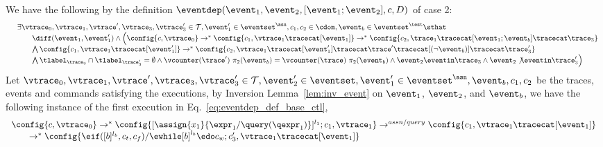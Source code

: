 \begin{subproof}
%
\label{pf:eventdep_base_ctl}
We have the following by the definition $\eventdep(\event_1, \event_2, [\event_1; \event_2], c, D)$ of case 2:
\begin{equation}
  \label{eq:eventdep_def_base_ctl}
  \begin{array}{ll}   
    & \exists \vtrace_0,
    \vtrace_1, \vtrace', \vtrace_3, \vtrace_3' \in \mathcal{T},\event_1' \in \eventset^{\asn}, {c}_1, {c}_2  \in \cdom, 
    \event_b \in \eventset^{\test}
    \sthat 
    \\ 
   &   \qquad    \diff(\event_1, \event_1') 
\land
   \Big(
  \config{{c}, \vtrace_0} \rightarrow^{*} 
      \config{{c}_1, \vtrace_1 \tracecat [\event_1]}  \rightarrow^{*} 
      \config{c_2,  \trace_1 \tracecat [\event_1;\event_b] \tracecat  \trace_3} 
    \\   
   & \qquad \bigwedge 
    \config{{c}_1, \vtrace_1 \tracecat [\event_1']}  \rightarrow^{*} 
    \config{c_2,  \vtrace_1 \tracecat [\event_1'] \tracecat \trace' \tracecat [(\neg \event_b)] \tracecat \trace_3'} 
    \\
    & \qquad \bigwedge  \tlabel_{\trace_3} \cap \tlabel_{\trace_3'} = \emptyset
     \land \vcounter(\trace') ~  \pi_2(\event_b) = \vcounter(\trace) ~  \pi_2(\event_b)
      \land \event_2 \eventin \trace_3
    \land \event_2 \not\eventin \trace_3'
   \Big)
 \end{array}
  \end{equation}
%
Let $\vtrace_0,
\vtrace_1, \vtrace', \vtrace_3, \vtrace_3' \in \mathcal{T}, 
\event_2' \in \eventset, \event_1' \in \eventset^{\asn}, \event_b, {c}_1, {c}_2$ be the traces, events and commands satisfying the executions,
by Inversion Lemma~\ref{lem:inv_event} on 
$\event_1$, $\event_2$, and $\event_b$,
we have the following instance of the first execution in Eq.~\ref{eq:eventdep_def_base_ctl},
%
\begin{equation}
\label{eq:ctldep_inv1}
  \begin{array}{l}   
\config{{c}, \vtrace_0} \rightarrow^{*} 
\config{[\assign{{x}_1}{\expr_1 / \query(\qexpr_1)}]^{l_1} ; {c}_1, \vtrace_1}  
\rightarrow^{assn/query}
 \config{c_1, \vtrace_1 \tracecat [\event_1]} 
 \\
  \qquad \rightarrow^{*} 
  \config{\eif ([b]^{l_b}, c_t, c_f) / \ewhile [b]^{l_b} \edo c_w;{c}_3', 
  \vtrace_1 \tracecat [\event_1]} 

\end{array}
\end{equation}
\end{subproof}

